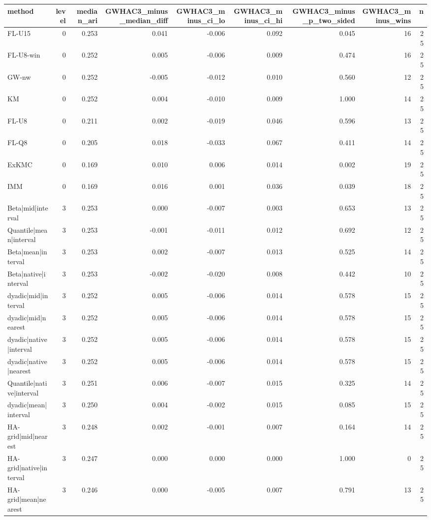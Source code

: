 \begin{tabular}{lrrrrrrrr}
\toprule
method & level & median_ari & GWHAC3_minus_median_diff & GWHAC3_minus_ci_lo & GWHAC3_minus_ci_hi & GWHAC3_minus_p_two_sided & GWHAC3_minus_wins & n \\
\midrule
FL-U15 & 0 & 0.253 & 0.041 & -0.006 & 0.092 & 0.045 & 16 & 25 \\
FL-U8-win & 0 & 0.252 & 0.005 & -0.006 & 0.009 & 0.474 & 16 & 25 \\
GW-nw & 0 & 0.252 & -0.005 & -0.012 & 0.010 & 0.560 & 12 & 25 \\
KM & 0 & 0.252 & 0.004 & -0.010 & 0.009 & 1.000 & 14 & 25 \\
FL-U8 & 0 & 0.211 & 0.002 & -0.019 & 0.046 & 0.596 & 13 & 25 \\
FL-Q8 & 0 & 0.205 & 0.018 & -0.033 & 0.067 & 0.411 & 14 & 25 \\
ExKMC & 0 & 0.169 & 0.010 & 0.006 & 0.014 & 0.002 & 19 & 25 \\
IMM & 0 & 0.169 & 0.016 & 0.001 & 0.036 & 0.039 & 18 & 25 \\
Beta|mid|interval & 3 & 0.253 & 0.000 & -0.007 & 0.003 & 0.653 & 13 & 25 \\
Quantile|mean|interval & 3 & 0.253 & -0.001 & -0.011 & 0.012 & 0.692 & 12 & 25 \\
Beta|mean|interval & 3 & 0.253 & 0.002 & -0.007 & 0.013 & 0.525 & 14 & 25 \\
Beta|native|interval & 3 & 0.253 & -0.002 & -0.020 & 0.008 & 0.442 & 10 & 25 \\
dyadic|mid|interval & 3 & 0.252 & 0.005 & -0.006 & 0.014 & 0.578 & 15 & 25 \\
dyadic|mid|nearest & 3 & 0.252 & 0.005 & -0.006 & 0.014 & 0.578 & 15 & 25 \\
dyadic|native|interval & 3 & 0.252 & 0.005 & -0.006 & 0.014 & 0.578 & 15 & 25 \\
dyadic|native|nearest & 3 & 0.252 & 0.005 & -0.006 & 0.014 & 0.578 & 15 & 25 \\
Quantile|native|interval & 3 & 0.251 & 0.006 & -0.007 & 0.015 & 0.325 & 14 & 25 \\
dyadic|mean|interval & 3 & 0.250 & 0.004 & -0.002 & 0.015 & 0.085 & 15 & 25 \\
HA-grid|mid|nearest & 3 & 0.248 & 0.002 & -0.001 & 0.007 & 0.164 & 14 & 25 \\
HA-grid|native|interval & 3 & 0.247 & 0.000 & 0.000 & 0.000 & 1.000 & 0 & 25 \\
HA-grid|mean|nearest & 3 & 0.246 & 0.000 & -0.005 & 0.007 & 0.791 & 13 & 25 \\

\end{tabular}
